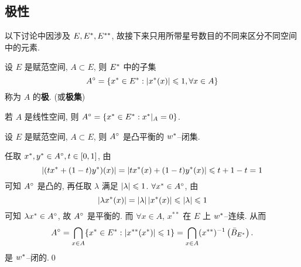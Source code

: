     \subsection{极性}
    以下讨论中因涉及 $ E, E^{*}, E^{**} $, 故接下来只用所带星号数目的不同来区分不同空间中的元素.
    
    \begin{Definition}[极]\label{def:极}
        设 $ E $ 是赋范空间, $ A\subset E $, 则 $ E^{*} $ 中的子集
        \[
            A^{\circ} = \{ x^{*}\in E^{*}:\left| x^{*}(x) \right| \leqslant1, \forall x\in A \}
        \]
        称为 $ A $ 的\textbf{极}. (或\textbf{极集})
    \end{Definition}

    \begin{Remark}
        若 $ A $ 是线性空间, 则 $ A^{\circ}=\{ x^{*}\in E^{*}:x^{*}|_{A}=0 \} $.
    \end{Remark}
    \begin{Proposition}\label{prop:极的w*闭性}
        设 $ E $ 是赋范空间, $ A\subset E $, 则 $ A^{\circ} $ 是凸平衡的 $ w^{*} $--闭集.
    \end{Proposition}
    \begin{Proof}
        任取 $ x^{*}, y^{*}\in A^{\circ}, t\in[0, 1] $, 由
        \[
            \left| (tx^{*}+(1-t)y^{*})(x) \right| =\left| tx^{*}(x)+(1-t)y^{*}(x) \right| \leqslant t+1-t=1
        \]
        可知 $ A^{\circ} $ 是凸的, 再任取 $ \lambda $ 满足 $ \left| \lambda \right| \leqslant1 $. $ \forall x^{*}\in A^{\circ} $, 由
        \[
            \left| \lambda x^{*}(x) \right| =\left| \lambda \right| \left| x^{*}(x) \right| \leqslant\left| \lambda \right| \leqslant1
        \]
        可知 $ \lambda x^{*}\in A^{\circ} $, 故 $ A^{\circ} $ 是平衡的. 而 $ \forall x\in A $, $ x^{**} $ 在 $ E $ 上 $ w^{*} $--连续. 从而
        \[
            A^{\circ}=\bigcap_{x\in A}\{ x^{*}\in E^{*}:\left| x^{**}(x^{*}) \right| \leqslant1 \}=\bigcap_{x\in A}(x^{**})^{-1}\left( \bar{B}_{E^{*}} \right).
        \]
        是 $ w^{*} $--闭的.\qed
    \end{Proof}

